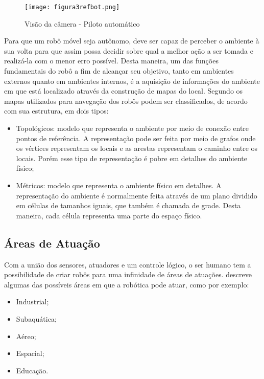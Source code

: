 \begin{figure}[h!]												
	\centering												
	\texttt{[image: figura3refbot.png]}			
	\caption{Visão da câmera - Piloto automático}		
	\label{img:denavit}	
\end{figure}

Para que um robô móvel seja autônomo, deve ser capaz de perceber o ambiente à sua volta para que assim possa decidir sobre qual a melhor ação a ser tomada e realizá-la com o menor erro possível. Desta maneira, um das funções fundamentais do robô a fim de alcançar seu objetivo, tanto em ambientes externos quanto em ambientes internos, é a aquisição de informações do ambiente em que está localizado através da construção de mapas do local. Segundo \cite{murphy} os mapas utilizados para navegação dos robôs podem ser classificados, de acordo com sua estrutura, em dois tipos:

\begin{itemize}
	\item Topológicos: modelo que representa o ambiente por meio de conexão entre pontos de referência. A representação pode ser feita por meio de grafos onde os vértices representam os locais e as arestas representam o caminho entre os locais. Porém esse tipo de representação é pobre em detalhes do ambiente físico;
	
	\item Métricos: modelo que representa o ambiente físico em detalhes. A representação do ambiente é normalmente feita através de um plano dividido em células de tamanhos iguais, que também é chamada de grade. Desta maneira, cada célula representa uma parte do espaço físico.
\end{itemize}

\subsection{Áreas de Atuação}\label{sec:atuation}
Com a união dos sensores, atuadores e um controle lógico, o ser humano tem a possibilidade de criar robôs para uma infinidade de áreas de atuações. \cite{siciliano2016} descreve algumas das possíveis áreas em que a robótica pode atuar, como por exemplo:

\begin{itemize}
	\item Industrial;
	
	\item Subaquática;
	
	\item Aéreo;
	
	\item Espacial;
	
	\item Educação.
\end{itemize}

